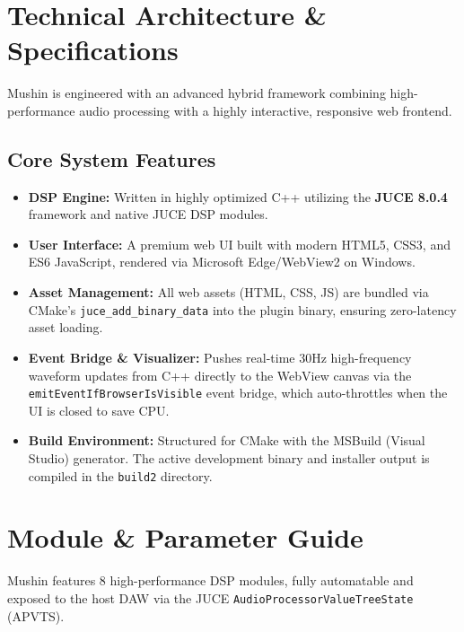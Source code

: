 \documentclass[11pt,a4paper,oneside]{book}
\begin{document}
\chapter{Technical Architecture \& Specifications}

Mushin is engineered with an advanced hybrid framework combining high-performance audio processing with a highly interactive, responsive web frontend.

\section{Core System Features}
\begin{itemize}
    \item \textbf{DSP Engine:} Written in highly optimized C++ utilizing the \textbf{JUCE 8.0.4} framework and native JUCE DSP modules.
    \item \textbf{User Interface:} A premium web UI built with modern HTML5, CSS3, and ES6 JavaScript, rendered via Microsoft Edge/WebView2 on Windows.
    \item \textbf{Asset Management:} All web assets (HTML, CSS, JS) are bundled via CMake's \texttt{juce\_add\_binary\_data} into the plugin binary, ensuring zero-latency asset loading.
    \item \textbf{Event Bridge \& Visualizer:} Pushes real-time 30Hz high-frequency waveform updates from C++ directly to the WebView canvas via the \texttt{emitEventIfBrowserIsVisible} event bridge, which auto-throttles when the UI is closed to save CPU.
    \item \textbf{Build Environment:} Structured for CMake with the MSBuild (Visual Studio) generator. The active development binary and installer output is compiled in the \texttt{build2} directory.
\end{itemize}

\chapter{Module \& Parameter Guide}

Mushin features 8 high-performance DSP modules, fully automatable and exposed to the host DAW via the JUCE \texttt{AudioProcessorValueTreeState} (APVTS).
\end{document}
